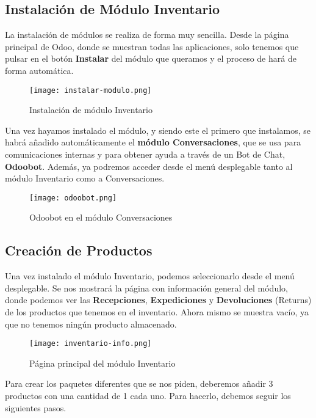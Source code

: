 \subsection{Instalación de Módulo Inventario}
La instalación de módulos se realiza de forma muy sencilla. Desde la página principal de Odoo, donde se muestran todas las aplicaciones, solo tenemos que pulsar en el botón \textbf{Instalar} del módulo que queramos y el proceso de hará de forma automática.

\begin{figure}[ht]
    \centering
    \texttt{[image: instalar-modulo.png]}
    \caption{Instalación de módulo Inventario}
\end{figure}

Una vez hayamos instalado el módulo, y siendo este el primero que instalamos, se habrá añadido automáticamente el \textbf{módulo Conversaciones}, que se usa para comunicaciones internas y para obtener ayuda a través de un Bot de Chat, \textbf{Odoobot}. Además, ya podremos acceder desde el menú desplegable tanto al módulo Inventario como a Conversaciones.

\begin{figure}[ht]
    \centering
    \texttt{[image: odoobot.png]}
    \caption{Odoobot en el módulo Conversaciones}
\end{figure}

\subsection{Creación de Productos}
Una vez instalado el módulo Inventario, podemos seleccionarlo desde el menú desplegable. Se nos mostrará la página con información general del módulo, donde podemos ver las \textbf{Recepciones}, \textbf{Expediciones} y \textbf{Devoluciones} (Returns) de los productos que tenemos en el inventario. Ahora mismo se muestra vacío, ya que no tenemos ningún producto almacenado.

\begin{figure}[ht]
    \centering
    \texttt{[image: inventario-info.png]}
    \caption{Página principal del módulo Inventario}
\end{figure}

Para crear los paquetes diferentes que se nos piden, deberemos añadir 3 productos con una cantidad de 1 cada uno. Para hacerlo, debemos seguir los siguientes pasos.

\vspace{5ex}

